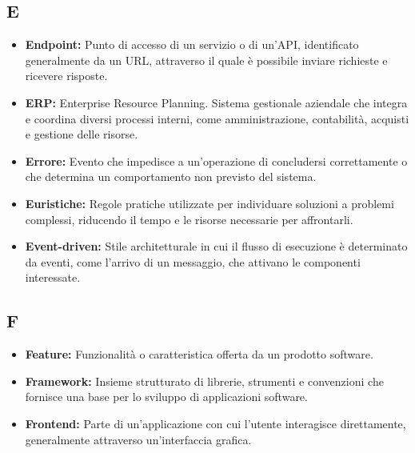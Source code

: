 
{}
\subsection*{E}

\begin{itemize}
    \item \textbf{Endpoint:} Punto di accesso di un servizio o di un'API, identificato generalmente da un URL, attraverso il quale è possibile inviare richieste e ricevere risposte.
    \item \textbf{ERP:} Enterprise Resource Planning. Sistema gestionale aziendale che integra e coordina diversi processi interni, come amministrazione, contabilità, acquisti e gestione delle risorse.
    \item \textbf{Errore:} Evento che impedisce a un'operazione di concludersi correttamente o che determina un comportamento non previsto del sistema.
    \item \textbf{Euristiche:} Regole pratiche utilizzate per individuare soluzioni a problemi complessi, riducendo il tempo e le risorse necessarie per affrontarli.
    \item \textbf{Event-driven:} Stile architetturale in cui il flusso di esecuzione è determinato da eventi, come l'arrivo di un messaggio, che attivano le componenti interessate.
\end{itemize}


{}
\subsection*{F}

\begin{itemize}
    \item \textbf{Feature:} Funzionalità o caratteristica offerta da un prodotto software.
    \item \textbf{Framework:} Insieme strutturato di librerie, strumenti e convenzioni che fornisce una base per lo sviluppo di applicazioni software.
    \item \textbf{Frontend:} Parte di un'applicazione con cui l'utente interagisce direttamente, generalmente attraverso un'interfaccia grafica.
\end{itemize}


